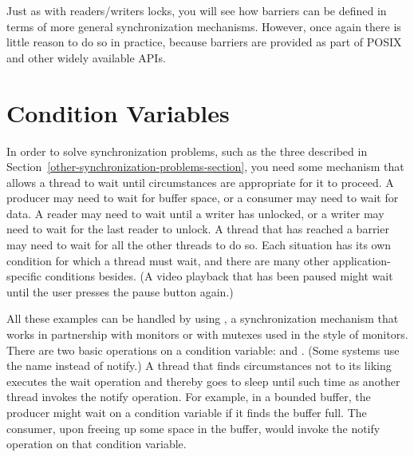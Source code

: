 Just as with readers/writers locks, you will see how barriers can be
defined in terms of more general synchronization mechanisms.  However,
once again there is little reason to do so in practice, because barriers
are provided as part of POSIX and other widely available APIs.

\section{Condition Variables}\label{condition-variables-section}

In order to solve synchronization problems, such as the three described
in Section~\ref{other-synchronization-problems-section},
you need some mechanism that allows a thread to wait
until circumstances are appropriate for it to proceed.  A producer may
need to wait for buffer space, or a consumer may need to wait for
data.  A reader may need to wait until a writer has unlocked, or a
writer may need to wait for the last reader to unlock.  A thread that
has reached a barrier may need to wait for all the other threads to do
so.  Each situation has its own condition for which a thread must
wait, and there are many other application-specific conditions
besides.  (A video playback that has been paused might wait until the
user presses the pause button again.)

All these examples can be handled by using , a
synchronization mechanism that works in partnership with monitors or
with mutexes used in the style of monitors.  There are two basic
operations on a condition variable:  and .  (Some systems
use the name  instead of notify.)  A thread that finds
circumstances not to its liking executes the wait operation and
thereby goes to sleep until such time as another thread invokes the
notify operation.  For example, in a bounded buffer, the producer
might wait on a condition variable if it finds the buffer full.  The
consumer, upon freeing up some space in the buffer, would invoke the
notify operation on that condition variable.

